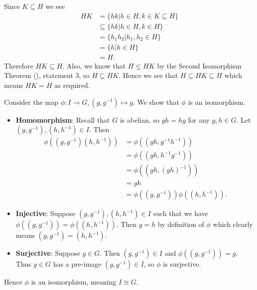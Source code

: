 \begin{questions}
    \item Since $K \subseteq H$ we see
    \begin{align*}
        HK &= \{hk \vert h \in H, k \in K \subseteq H\}\\
        &\subseteq \{hk \vert h \in H, k \in H\}\\
        &= \{h_1h_2 \vert h_1, h_2 \in H\}\\
        &= \{h \vert h \in H\}\\
        &= H.
    \end{align*}
    Therefore $HK \subseteq H$. Also, we know that $H \leq HK$ by the Second Isomorphism Theorem (), statement 3, so $H \subseteq HK$. Hence we see that $H \subseteq HK \subseteq H$ which means $HK = H$ as required.

    \item \begin{partquestions}{\alph*}
        \item Consider the map $\phi: I \to G, (g, g^{-1}) \mapsto g$. We show that $\phi$ is an isomorphism.
        \begin{itemize}
            \item \textbf{Homomorphism}: Recall that $G$ is abelian, so $gh = hg$ for any $g, h \in G$. Let $(g, g^{-1}), (h, h^{-1}) \in I$. Then
            \begin{align*}
                \phi((g, g^{-1})(h, h^{-1})) &= \phi((gh, g^{-1}h^{-1}))\\
                &= \phi((gh, h^{-1}g^{-1}))\\
                &= \phi((gh, (gh)^{-1}))\\
                &= gh\\
                &= \phi((g, g^{-1}))\phi((h, h^{-1})).
            \end{align*}

            \item \textbf{Injective}: Suppose $(g, g^{-1}), (h, h^{-1}) \in I$ such that we have $\phi((g, g^{-1})) = \phi((h, h^{-1}))$. Then $g = h$ by definition of $\phi$ which clearly means $(g, g^{-1}) = (h, h^{-1})$.

            \item \textbf{Surjective}: Suppose $g \in G$. Then $(g, g^{-1}) \in I$ and $\phi((g, g^{-1})) = g$. Thus $g \in G$ has a pre-image $(g, g^{-1}) \in I$, so $\phi$ is surjective.
        \end{itemize}
        Hence $\phi$ is an isomorphism, meaning $I \cong G$.


\end{partquestions}
\end{questions}
